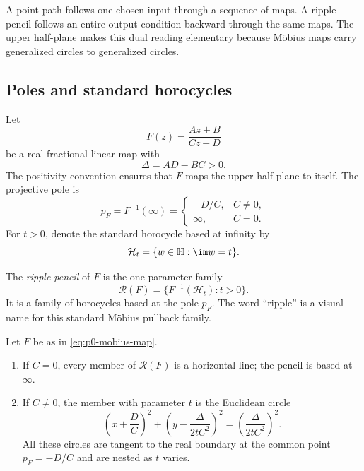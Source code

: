 A point path follows one chosen input through a sequence of maps.  A ripple
pencil follows an entire output condition backward through the same maps.  The
upper half-plane makes this dual reading elementary because M\"obius maps carry
generalized circles to generalized circles.

\subsection{Poles and standard horocycles}

Let
\begin{equation}\label{eq:p0-mobius-map}
  F(z)=\frac{Az+B}{Cz+D}
\end{equation}
be a real fractional linear map with
\[
  \Delta=AD-BC>0.
\]
The positivity convention ensures that $F$ maps the upper half-plane to itself.
The projective pole is
\[
  p_F=F^{-1}(\infty)
  =\begin{cases}
     -D/C,&C\ne0,\\
     \infty,&C=0.
   \end{cases}
\]
For $t>0$, denote the standard horocycle based at infinity by
\[
  \mathcal H_t=\{w\in\mathbb H:\im w=t\}.
\]

\begin{definition}
\label{def:p0-ripple-pencil}
The \emph{ripple pencil} of $F$ is the one-parameter family
\[
  \mathcal R(F)
  =\{F^{-1}(\mathcal H_t):t>0\}.
\]
It is a family of horocycles based at the pole $p_F$.  The word ``ripple'' is a
visual name for this standard M\"obius pullback family.
\end{definition}

\begin{theorem}
\label{thm:p0-ripple-pencil-formula}
Let $F$ be as in \eqref{eq:p0-mobius-map}.

\begin{enumerate}
  \item If $C=0$, every member of $\mathcal R(F)$ is a horizontal line; the
  pencil is based at $\infty$.

  \item If $C\ne0$, the member with parameter $t$ is the Euclidean circle
  \begin{equation}\label{eq:p0-ripple-circle}
    \left(x+\frac DC\right)^2
    +\left(y-\frac{\Delta}{2tC^2}\right)^2
    =\left(\frac{\Delta}{2tC^2}\right)^2.
  \end{equation}
  All these circles are tangent to the real boundary at the common point
  $p_F=-D/C$ and are nested as $t$ varies.
\end{enumerate}
\end{theorem}

